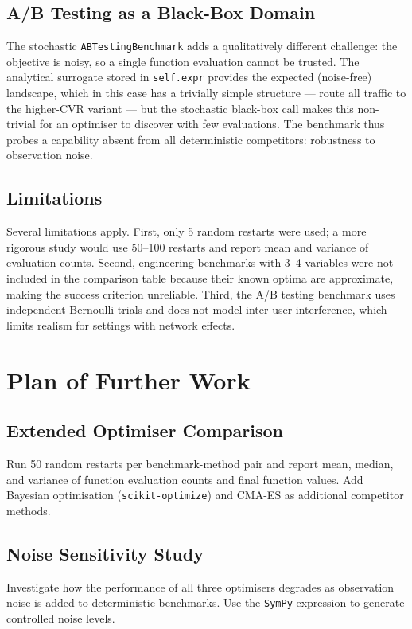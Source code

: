 \subsection{A/B Testing as a Black-Box Domain}

The stochastic \texttt{ABTestingBenchmark} adds a qualitatively different
challenge: the objective is noisy, so a single function evaluation cannot
be trusted. The analytical surrogate stored in \texttt{self.expr} provides
the expected (noise-free) landscape, which in this case has a trivially
simple structure — route all traffic to the higher-CVR variant — but the
stochastic black-box call makes this non-trivial for an optimiser to
discover with few evaluations. The benchmark thus probes a capability
absent from all deterministic competitors: robustness to observation noise.

\subsection{Limitations}

Several limitations apply. First, only 5 random restarts were used;
a more rigorous study would use 50--100 restarts and report mean and
variance of evaluation counts. Second, engineering benchmarks with 3--4
variables were not included in the comparison table because their known
optima are approximate, making the success criterion unreliable. Third,
the A/B testing benchmark uses independent Bernoulli trials and does not
model inter-user interference, which limits realism for settings with
network effects.

\clearpage

\section{Plan of Further Work}

\subsection{Extended Optimiser Comparison}
Run 50 random restarts per benchmark-method pair and report mean, median,
and variance of function evaluation counts and final function values.
Add Bayesian optimisation (\texttt{scikit-optimize}) and CMA-ES as
additional competitor methods.

\subsection{Noise Sensitivity Study}
Investigate how the performance of all three optimisers degrades as
observation noise is added to deterministic benchmarks. Use the
\texttt{SymPy} expression to generate controlled noise levels.


